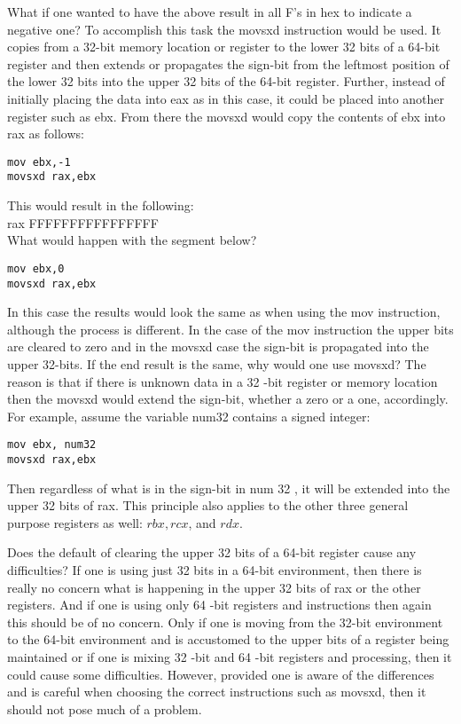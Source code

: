 \documentclass[10pt]{article}
\begin{document}
What if one wanted to have the above result in all F's in hex to indicate a negative one? To accomplish this task the movsxd instruction would be used. It copies from a 32-bit memory location or register to the lower 32 bits of a 64-bit register and then extends or propagates the sign-bit from the leftmost position of the lower 32 bits into the upper 32 bits of the 64-bit register. Further, instead of initially placing the data into eax as in this case, it could be placed into another register such as ebx. From there the movsxd would copy the contents of ebx into rax as follows:

\begin{verbatim}
mov ebx,-1
movsxd rax,ebx
\end{verbatim}

This would result in the following:\\
rax FFFFFFFFFFFFFFFF\\
What would happen with the segment below?

\begin{verbatim}
mov ebx,0
movsxd rax,ebx
\end{verbatim}

In this case the results would look the same as when using the mov instruction, although the process is different. In the case of the mov instruction the upper bits are cleared to zero and in the movsxd case the sign-bit is propagated into the upper 32-bits. If the end result is the same, why would one use movsxd? The reason is that if there is unknown data in a 32 -bit register or memory location then the movsxd would extend the sign-bit, whether a zero or a one, accordingly. For example, assume the variable num32 contains a signed integer:

\begin{verbatim}
mov ebx, num32
movsxd rax,ebx
\end{verbatim}

Then regardless of what is in the sign-bit in num 32 , it will be extended into the upper 32 bits of rax. This principle also applies to the other three general purpose registers as well: $r b x, r c x$, and $r d x$.

Does the default of clearing the upper 32 bits of a 64-bit register cause any difficulties? If one is using just 32 bits in a 64-bit environment, then there is really no concern what is happening in the upper 32 bits of rax or the other registers. And if one is using only 64 -bit registers and instructions then again this should be of no concern. Only if one is moving from the 32-bit environment to the 64-bit environment and is accustomed to the upper bits of a register being maintained or if one is mixing 32 -bit and 64 -bit registers and processing, then it could cause some difficulties. However, provided one is aware of the differences and is careful when choosing the correct instructions such as movsxd, then it should not pose much of a problem.
\end{document}
